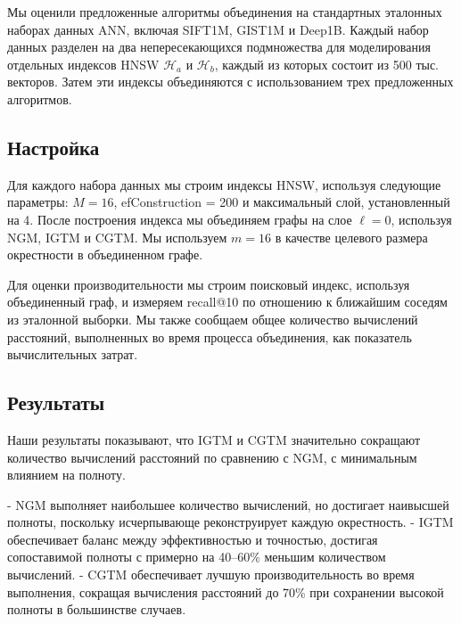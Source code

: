 \documentclass{article}
\begin{document}
Мы оценили предложенные алгоритмы объединения на стандартных эталонных наборах данных ANN, включая SIFT1M, GIST1M и Deep1B.
Каждый набор данных разделен на два непересекающихся подмножества для моделирования отдельных индексов HNSW $\mathcal{H}_a$ и $\mathcal{H}_b$, каждый из которых состоит из 500 тыс. векторов.
Затем эти индексы объединяются с использованием трех предложенных алгоритмов.

\subsection{Настройка}

Для каждого набора данных мы строим индексы HNSW, используя следующие параметры: $M = 16$, efConstruction = 200 и максимальный слой, установленный на 4.
После построения индекса мы объединяем графы на слое $\ell = 0$, используя \textsc{NGM}, \textsc{IGTM} и \textsc{CGTM}. Мы используем $m = 16$ в качестве целевого размера окрестности в объединенном графе.

Для оценки производительности мы строим поисковый индекс, используя объединенный граф, и измеряем recall@10 по отношению к ближайшим соседям из эталонной выборки.
Мы также сообщаем общее количество вычислений расстояний, выполненных во время процесса объединения, как показатель вычислительных затрат.

\subsection{Результаты}

Наши результаты показывают, что \textsc{IGTM} и \textsc{CGTM} значительно сокращают количество вычислений расстояний по сравнению с \textsc{NGM}, с минимальным влиянием на полноту.

- \textsc{NGM} выполняет наибольшее количество вычислений, но достигает наивысшей полноты, поскольку исчерпывающе реконструирует каждую окрестность.
- \textsc{IGTM} обеспечивает баланс между эффективностью и точностью, достигая сопоставимой полноты с примерно на 40–60\% меньшим количеством вычислений.
- \textsc{CGTM} обеспечивает лучшую производительность во время выполнения, сокращая вычисления расстояний до 70\% при сохранении высокой полноты в большинстве случаев.
\end{document}
